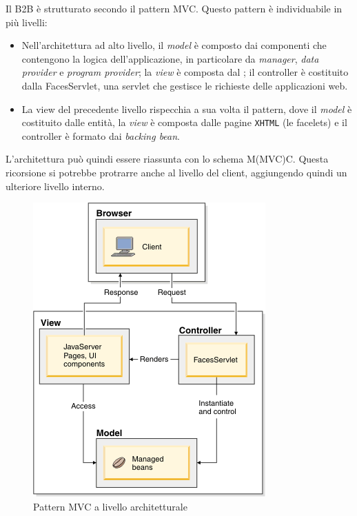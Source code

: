 Il B2B è strutturato secondo il pattern \Gls{MVC}. Questo pattern è individuabile in più livelli:
\begin{itemize}
	\item Nell'architettura ad alto livello, il \textit{model} è composto dai componenti che contengono la logica dell'applicazione, in particolare da \textit{manager}, \textit{data provider} e \textit{program provider}; la \textit{view} è composta dal ; il controller è costituito dalla FacesServlet, una \gls{servlet} che gestisce le richieste delle applicazioni web.
	\item La view del precedente livello rispecchia a sua volta il pattern, dove il \textit{model} è costituito dalle entità, la \textit{view} è composta dalle pagine \texttt{\gls{XHTML}} (le \gls{facelets}) e il controller è formato dai \textit{backing bean}.
\end{itemize}
L'architettura può quindi essere riassunta con lo schema M(MVC)C. Questa ricorsione si potrebbe protrarre anche al livello del client, aggiungendo quindi un ulteriore livello interno.
\begin{figure}
	\centering
	\includegraphics{Immagini/mvc-jsf.png}
	\caption{Pattern MVC a livello architetturale}
\end{figure}

